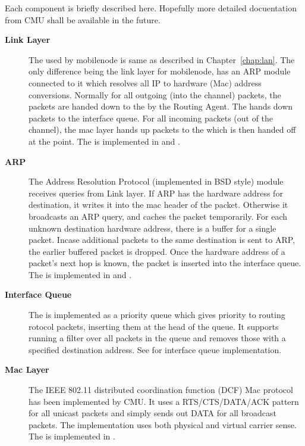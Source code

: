 Each component is briefly described here. Hopefully more detailed
docuentation from CMU shall be available in the future. 
\begin{description}
\item[{\bf Link Layer}] The  used by mobilenode is same as
  described in Chapter~\ref{chap:lan}. The only difference being the
  link layer for mobilenode, has an ARP module connected to it which
  resolves all IP to hardware (Mac) address conversions. Normally for
  all outgoing (into the channel) packets, the packets are handed down
  to the  by the Routing Agent. The  hands down
  packets to the interface queue. For all incoming packets (out of the
  channel), the mac layer hands up packets to the  which is
  then handed off at the  point. The
   is implemented in  and
  .

\item [{\bf ARP}] The Address Resolution Protocol (implemented in BSD
  style) module receives queries from Link layer. If ARP has the
  hardware address for destination, it writes it into the mac header
  of the packet. Otherwise it broadcasts an ARP query, and caches the
  packet temporarily. For each unknown destination hardware address,
  there is a buffer for a single packet. Incase additional packets to
  the same destination is sent to ARP, the earlier buffered packet is
  dropped. Once the hardware address of a
  packet's next hop is known, the packet is inserted into the
  interface queue. The  is implemented
  in  and .

\item[{\bf Interface Queue}] The 
  is implemented as a priority queue which gives priority to routing  
  rotocol packets, inserting them at the head of the queue. It supports
  running a filter over all packets in the queue and removes those with
  a specified destination address. See  for 
  interface queue implementation.

\item[{\bf Mac Layer}] The IEEE 802.11 distributed coordination 
  function (DCF) Mac protocol has been implemented by CMU. It uses a 
  RTS/CTS/DATA/ACK pattern for all unicast packets and simply sends out
  DATA for all broadcast packets. The implementation uses both 
  physical and virtual carrier sense. The
   is implemented in
  .
  

\end{description}
